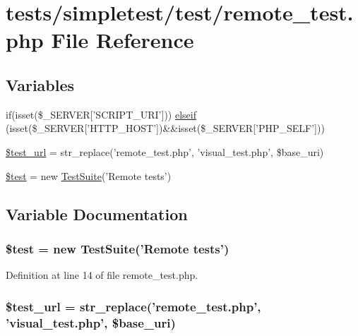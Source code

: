 \hypertarget{remote__test_8php}{\section{tests/simpletest/test/remote\-\_\-test.php File Reference}
\label{remote__test_8php}
}
\subsection*{Variables}
\begin{DoxyCompactItemize}
\item 
if(isset(\$\-\_\-\-S\-E\-R\-V\-E\-R\mbox{[}'S\-C\-R\-I\-P\-T\-\_\-\-U\-R\-I'\mbox{]})) \hyperlink{remote__test_8php_a7e3c7052d9d98df94e744d4aab6c9dd5}{elseif} (isset(\$\-\_\-\-S\-E\-R\-V\-E\-R\mbox{[}'H\-T\-T\-P\-\_\-\-H\-O\-S\-T'\mbox{]})\&\&isset(\$\-\_\-\-S\-E\-R\-V\-E\-R\mbox{[}'P\-H\-P\-\_\-\-S\-E\-L\-F'\mbox{]}))
\item 
\hyperlink{remote__test_8php_a2e81b8210fb799a34a8ca0514cf27fb7}{\$test\-\_\-url} = str\-\_\-replace('remote\-\_\-test.\-php', 'visual\-\_\-test.\-php', \$base\-\_\-uri)
\item 
\hyperlink{remote__test_8php_a31daebf88fc668f410293e2c70cea3fc}{\$test} = new \hyperlink{class_test_suite}{Test\-Suite}('Remote tests')
\end{DoxyCompactItemize}


\subsection{Variable Documentation}
\hypertarget{remote__test_8php_a31daebf88fc668f410293e2c70cea3fc}{
\subsubsection[{\$test}]{\setlength{\rightskip}{0pt plus 5cm}\$test = new {\bf Test\-Suite}('Remote tests')}}\label{remote__test_8php_a31daebf88fc668f410293e2c70cea3fc}


Definition at line 14 of file remote\-\_\-test.\-php.

\hypertarget{remote__test_8php_a2e81b8210fb799a34a8ca0514cf27fb7}{
\subsubsection[{\$test\-\_\-url}]{\setlength{\rightskip}{0pt plus 5cm}\$test\-\_\-url = str\-\_\-replace('remote\-\_\-test.\-php', 'visual\-\_\-test.\-php', \$base\-\_\-uri)}}\label{remote__test_8php_a2e81b8210fb799a34a8ca0514cf27fb7}


